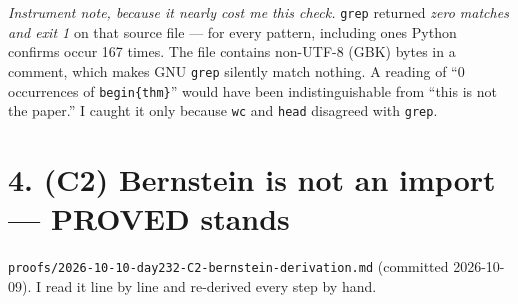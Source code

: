 \documentclass[11pt]{article}
\begin{document}
\emph{Instrument note, because it nearly cost me this check.} \texttt{grep} returned
\emph{zero matches and exit 1} on that source file --- for every pattern, including ones Python
confirms occur 167 times. The file contains non-UTF-8 (GBK) bytes in a comment, which makes GNU
\texttt{grep} silently match nothing. A reading of ``0 occurrences of \texttt{begin\{thm\}}''
would have been indistinguishable from ``this is not the paper.'' I caught it only because
\texttt{wc} and \texttt{head} disagreed with \texttt{grep}.

\section*{4. (C2) Bernstein is not an import --- PROVED stands}

\texttt{proofs/2026-10-10-day232-C2-bernstein-derivation.md} (committed 2026-10-09). I read it
line by line and re-derived every step by hand.
\end{document}
